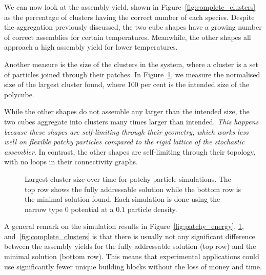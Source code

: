 

We can now look at the assembly yield, shown in Figure~\ref{fig:complete_clusters} as the percentage of clusters having the correct number of each species. Despite the aggregation previously discussed, the two cube shapes have a growing number of correct assemblies for certain temperatures. Meanwhile, the other shapes all approach a high assembly yield for lower temperatures.

Another measure is the size of the clusters in the system, where a cluster is a set of particles joined through their patches. In Figure~\ref{fig:max_cluster}, we measure the normalised size of the largest cluster found, where 100 per cent is the intended size of the polycube. 

While the other shapes do not assemble any larger than the intended size, the two cubes aggregate into clusters many times larger than intended. \emph{This happens because these shapes are self-limiting through their geometry, which works less well on flexible patchy particles compared to the rigid lattice of the stochastic assembler}. In contrast, the other shapes are self-limiting through their topology, with no loops in their connectivity graphs.

\begin{figure}[ht]
    \centering
    \caption{Largest cluster size over time for patchy particle simulations. The top row shows the fully addressable solution while the bottom row is the minimal solution found. Each simulation is done using the narrow type \(0\) potential at a \(0.1\) particle density.}
    \label{fig:max_cluster}
\end{figure}

A general remark on the simulation results in Figure~\ref{fig:patchy_energy}, \ref{fig:max_cluster}, and~\ref{fig:complete_clusters} is that there is usually not any significant difference between the assembly yields for the fully addressable solution (top row) and the minimal solution (bottom row). This means that experimental applications could use significantly fewer unique building blocks without the loss of money and time.

